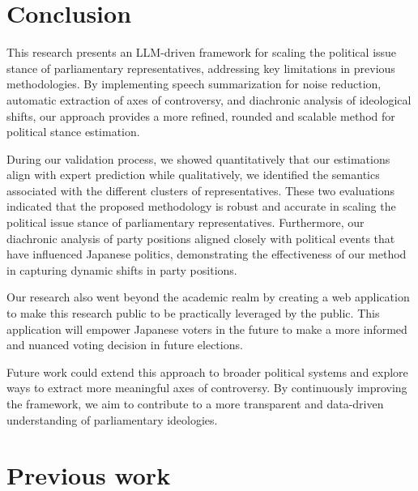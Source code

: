 \documentclass[final,5p,times,twocolumn,authoryear]{elsarticle}
\begin{document}
\section{Conclusion}
This research presents an LLM-driven framework for scaling the political issue stance of parliamentary representatives, addressing key limitations in previous methodologies. By implementing speech summarization for noise reduction, automatic extraction of axes of controversy, and diachronic analysis of ideological shifts, our approach provides a more refined, rounded and scalable method for political stance estimation. 

During our validation process, we showed quantitatively that our estimations align with expert prediction while qualitatively, we identified the semantics associated with the different clusters of representatives. These two evaluations indicated that the proposed methodology is robust and accurate in scaling the political issue stance of parliamentary representatives. Furthermore, our diachronic analysis of party positions aligned closely with political events that have influenced Japanese politics, demonstrating the effectiveness of our method in capturing dynamic shifts in party positions.

Our research also went beyond the academic realm by creating a web application to make this research public to be practically leveraged by the public. This application will empower Japanese voters in the future to make a more informed and nuanced voting decision in future elections.

Future work could extend this approach to broader political systems and explore ways to extract more meaningful axes of controversy. By continuously improving the framework, we aim to contribute to a more transparent and data-driven understanding of parliamentary ideologies.


\FloatBarrier
\clearpage
\appendix
\section{Previous work}
\end{document}
